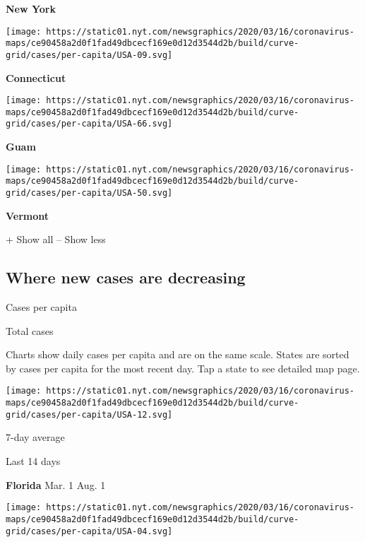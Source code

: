 \textbf{New York}

\href{https://www.nytimes.com/interactive/2020/us/connecticut-coronavirus-cases.html}{}

\texttt{[image: https://static01.nyt.com/newsgraphics/2020/03/16/coronavirus-maps/ce90458a2d0f1fad49dbcecf169e0d12d3544d2b/build/curve-grid/cases/per-capita/USA-09.svg]}

\textbf{Connecticut}

\texttt{[image: https://static01.nyt.com/newsgraphics/2020/03/16/coronavirus-maps/ce90458a2d0f1fad49dbcecf169e0d12d3544d2b/build/curve-grid/cases/per-capita/USA-66.svg]}

\textbf{Guam}

\href{https://www.nytimes.com/interactive/2020/us/vermont-coronavirus-cases.html}{}

\texttt{[image: https://static01.nyt.com/newsgraphics/2020/03/16/coronavirus-maps/ce90458a2d0f1fad49dbcecf169e0d12d3544d2b/build/curve-grid/cases/per-capita/USA-50.svg]}

\textbf{Vermont}

+ Show all -- Show less

\hypertarget{where-new-cases-are-decreasing}{%
\subsection{Where new cases are
decreasing}\label{where-new-cases-are-decreasing}}

Cases per capita

Total cases

Charts show daily cases per capita and are on the same scale. States are
sorted by cases per capita for the most recent day. Tap a state to see
detailed map page.

\href{https://www.nytimes.com/interactive/2020/us/florida-coronavirus-cases.html}{}

\texttt{[image: https://static01.nyt.com/newsgraphics/2020/03/16/coronavirus-maps/ce90458a2d0f1fad49dbcecf169e0d12d3544d2b/build/curve-grid/cases/per-capita/USA-12.svg]}

7-day average

Last 14 days

\textbf{Florida} Mar. 1 Aug. 1

\href{https://www.nytimes.com/interactive/2020/us/arizona-coronavirus-cases.html}{}

\texttt{[image: https://static01.nyt.com/newsgraphics/2020/03/16/coronavirus-maps/ce90458a2d0f1fad49dbcecf169e0d12d3544d2b/build/curve-grid/cases/per-capita/USA-04.svg]}


